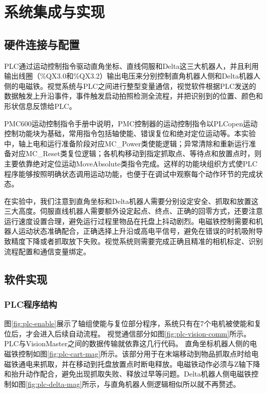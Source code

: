 \documentclass[UTF8,a4paper,12pt,fontset=windows]{ctexart}
\begin{document}
\section{系统集成与实现}

\subsection{硬件连接与配置}

PLC通过运动控制指令驱动直角坐标、直线伺服和Delta这三大机器人，并且利用输出线圈（\%QX3.0和\%QX3.2）输出电压来分别控制直角机器人侧和Delta机器人侧的电磁铁。视觉系统与PLC之间进行整型变量通信，视觉软件根据PLC发送的数据触发上升沿事件，事件触发启动拍照检测全流程，并把识别到的位置、颜色和形状信息反馈给PLC。

PMC600运动控制指令手册中说明，PMC控制器的运动控制指令以PLCopen运动控制功能块为基础，常用指令包括轴使能、错误复位和绝对定位运动等。本实验中，轴上电和运行准备阶段对应MC\_Power类使能逻辑；异常清除和重新运行准备对应MC\_Reset类复位逻辑；各机构移动到指定抓取点、等待点和放置点时，则主要依靠绝对定位运动MoveAbsolute类指令完成。这样的功能块组织方式使PLC程序能够按照明确状态调用运动功能，也便于在调试中观察每个动作环节的完成状态。

在实验中，我们注意到直角坐标和Delta机器人需要分别设定安全、抓取和放置这三大高度。伺服直线机器人需要额外设定起点、终点、正确的回零方式，还要注意运行速度设置合理，避免运行过程里物品在托盘上抖动剧烈。电磁铁控制需要和机器人运动状态准确配合，正确选择上升沿或高电平信号，避免在错误的时机吸附导致精度下降或者抓取放下失败。视觉系统则需要完成正确且精准的相机标定、识别流程配置和通信变量绑定。

\subsection{软件实现}

\subsubsection{PLC程序结构}

图\ref{fig:plc-enable}展示了轴组使能与复位部分程序，系统只有在7个电机被使能和复位后，才会进入后续自动流程。
视觉通信部分如图\ref{fig:plc-vision-comm}所示。PLC与VisionMaster之间的数据传输就依靠这几行代码。
直角坐标机器人侧的电磁铁控制如图\ref{fig:plc-cart-mag}所示。该部分用于在末端移动到物品抓取点时给电磁铁通电来抓取，并在移动到托盘放置点时断电释放。电磁铁动作必须与Z轴下降和抬升动作配合，避免出现抓取失败、释放过早等问题。Delta机器人侧电磁铁控制如图\ref{fig:plc-delta-mag}所示，与直角机器人侧逻辑相似所以就不再赘述。
\end{document}
